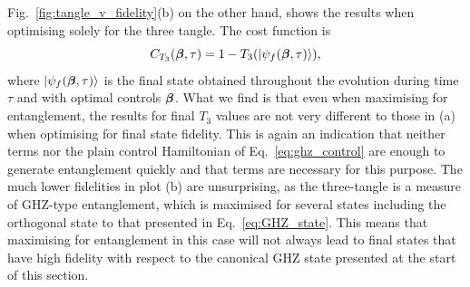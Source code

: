 Fig.~\ref{fig:tangle_v_fidelity}(b) on the other hand, shows the results when optimising solely for the three tangle. The cost function is
\begin{equation}\label{eq:tangle_costfunc}
    C_{T_3}(\boldsymbol{\beta}, \tau) = 1 - T_3(\ket{\psi_f(\boldsymbol{\beta}, \tau)}),
\end{equation}
where $\ket{\psi_f(\boldsymbol{\beta}, \tau)}$ is the final state obtained throughout the evolution during time $\tau$ and with optimal controls $\boldsymbol{\beta}$. What we find is that even when maximising for entanglement, the results for final $T_3$ values are not very different to those in (a) when optimising for final state fidelity. This is again an indication that neither  terms nor the plain control Hamiltonian of Eq.~\eqref{eq:ghz_control} are enough to generate entanglement quickly and that  terms are necessary for this purpose. The much lower fidelities in plot (b) are unsurprising, as the three-tangle is a measure of GHZ-type entanglement, which is maximised for several states including the orthogonal state to that presented in Eq.~\eqref{eq:GHZ_state}. This means that maximising for entanglement in this case will not always lead to final states that have high fidelity with respect to the canonical GHZ state presented at the start of this section.